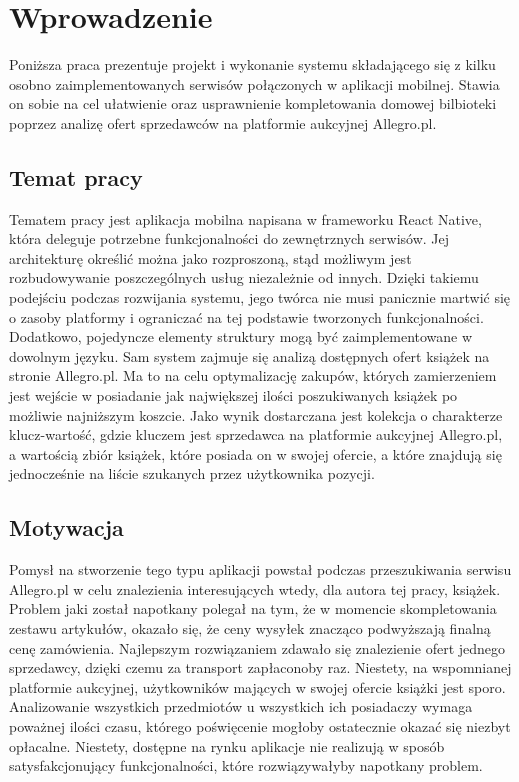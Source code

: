 \chapter{Wprowadzenie}
\label{cha:wprowadzenie}

Poniższa praca prezentuje projekt i wykonanie systemu składającego się z kilku osobno zaimplementowanych serwisów połączonych w aplikacji mobilnej.
Stawia on sobie na cel ułatwienie oraz usprawnienie kompletowania domowej bilbioteki poprzez analizę ofert sprzedawców na platformie aukcyjnej Allegro.pl.\newline
\newline

\section{Temat pracy}
\label{sec:tematPracy}

Tematem pracy jest aplikacja mobilna napisana w frameworku React Native, która deleguje potrzebne funkcjonalności do zewnętrznych serwisów. Jej architekturę określić można jako rozproszoną, stąd możliwym jest rozbudowywanie poszczególnych usług niezależnie od innych. Dzięki takiemu podejściu podczas rozwijania systemu, jego twórca nie musi panicznie martwić się o zasoby platformy i ograniczać na tej podstawie tworzonych funkcjonalności. Dodatkowo, pojedyncze elementy struktury mogą być zaimplementowane w dowolnym języku.\newline
Sam system zajmuje się analizą dostępnych ofert książek na stronie Allegro.pl. Ma to na celu optymalizację zakupów, których zamierzeniem jest wejście w posiadanie jak największej ilości poszukiwanych książek po możliwie najniższym koszcie.\newline
Jako wynik dostarczana jest kolekcja o charakterze klucz-wartość, gdzie kluczem jest sprzedawca na platformie aukcyjnej Allegro.pl, a wartością zbiór książek, które posiada on w swojej ofercie, a które znajdują się jednocześnie na liście szukanych przez użytkownika pozycji.
\newpage
\section{Motywacja}
\label{sec:motywacja}
Pomysł na stworzenie tego typu aplikacji powstał podczas przeszukiwania serwisu Allegro.pl w celu znalezienia interesujących wtedy, dla autora tej pracy, książek. Problem jaki został napotkany polegał na tym, że w momencie skompletowania zestawu artykułów, okazało się, że ceny wysyłek znacząco podwyższają finalną cenę zamówienia. Najlepszym rozwiązaniem zdawało się znalezienie ofert jednego sprzedawcy, dzięki czemu za transport zapłaconoby raz. Niestety, na wspomnianej platformie aukcyjnej, użytkowników mających w swojej ofercie książki jest sporo. Analizowanie wszystkich przedmiotów u wszystkich ich posiadaczy wymaga poważnej ilości czasu, którego poświęcenie mogłoby ostatecznie okazać się niezbyt opłacalne.
Niestety, dostępne na rynku aplikacje nie realizują w sposób satysfakcjonujący funkcjonalności, które rozwiązywałyby napotkany problem.

